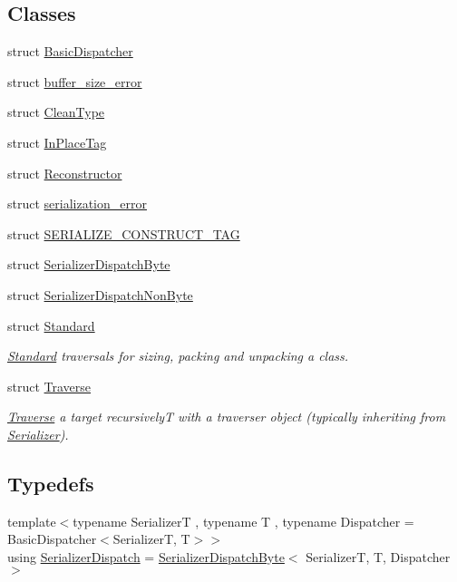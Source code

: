 \subsection*{Classes}
\begin{DoxyCompactItemize}
\item 
struct \hyperlink{structcheckpoint_1_1dispatch_1_1_basic_dispatcher}{Basic\+Dispatcher}
\item 
struct \hyperlink{structcheckpoint_1_1dispatch_1_1buffer__size__error}{buffer\+\_\+size\+\_\+error}
\item 
struct \hyperlink{structcheckpoint_1_1dispatch_1_1_clean_type}{Clean\+Type}
\item 
struct \hyperlink{structcheckpoint_1_1dispatch_1_1_in_place_tag}{In\+Place\+Tag}
\item 
struct \hyperlink{structcheckpoint_1_1dispatch_1_1_reconstructor}{Reconstructor}
\item 
struct \hyperlink{structcheckpoint_1_1dispatch_1_1serialization__error}{serialization\+\_\+error}
\item 
struct \hyperlink{structcheckpoint_1_1dispatch_1_1_s_e_r_i_a_l_i_z_e___c_o_n_s_t_r_u_c_t___t_a_g}{S\+E\+R\+I\+A\+L\+I\+Z\+E\+\_\+\+C\+O\+N\+S\+T\+R\+U\+C\+T\+\_\+\+T\+AG}
\item 
struct \hyperlink{structcheckpoint_1_1dispatch_1_1_serializer_dispatch_byte}{Serializer\+Dispatch\+Byte}
\item 
struct \hyperlink{structcheckpoint_1_1dispatch_1_1_serializer_dispatch_non_byte}{Serializer\+Dispatch\+Non\+Byte}
\item 
struct \hyperlink{structcheckpoint_1_1dispatch_1_1_standard}{Standard}
\begin{DoxyCompactList}\small\item\em \hyperlink{structcheckpoint_1_1dispatch_1_1_standard}{Standard} traversals for sizing, packing and unpacking a class. \end{DoxyCompactList}\item 
struct \hyperlink{structcheckpoint_1_1dispatch_1_1_traverse}{Traverse}
\begin{DoxyCompactList}\small\item\em \hyperlink{structcheckpoint_1_1dispatch_1_1_traverse}{Traverse} a target recursively{\ttfamily T} with a traverser object (typically inheriting from {\ttfamily \hyperlink{structcheckpoint_1_1_serializer}{Serializer}}). \end{DoxyCompactList}\end{DoxyCompactItemize}
\subsection*{Typedefs}
\begin{DoxyCompactItemize}
\item 
{\footnotesize template$<$typename SerializerT , typename T , typename Dispatcher  = Basic\+Dispatcher$<$\+Serializer\+T, T$>$$>$ }\\using \hyperlink{namespacecheckpoint_1_1dispatch_ae3a710db2b07fd1322ab9e6b3bbf45b4}{Serializer\+Dispatch} = \hyperlink{structcheckpoint_1_1dispatch_1_1_serializer_dispatch_byte}{Serializer\+Dispatch\+Byte}$<$ SerializerT, T, Dispatcher $>$
\end{DoxyCompactItemize}

